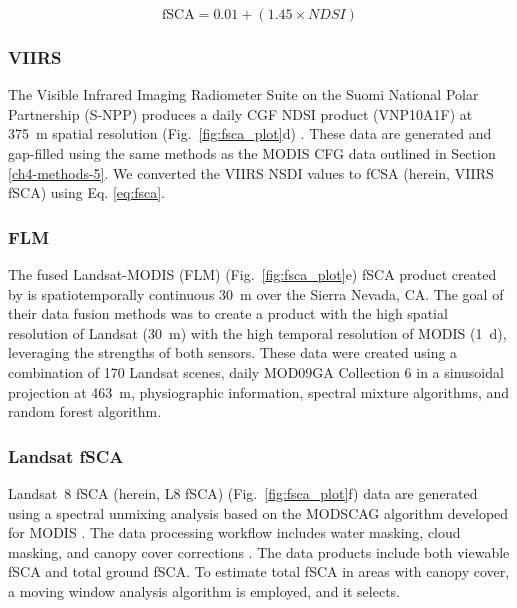 \begin{equation}
\text{fSCA} = 0.01 + (1.45 \times NDSI)
\label{eq:fsca}
\end{equation}

\hypertarget{ch4-methods-6}{\subsubsection{VIIRS}\label{ch4-methods-6}}

The Visible Infrared Imaging Radiometer Suite on the Suomi National Polar Partnership (S-NPP) produces a daily CGF NDSI product (VNP10A1F) at 375~m spatial resolution (Fig.~\ref{fig:fsca_plot}d) \citep{hallEvaluationMODISVIIRS2019}. These data are generated and gap-filled using the same methods as the MODIS CFG data outlined in Section \ref{ch4-methods-5}. We converted the VIIRS NSDI values to fCSA (herein, VIIRS fSCA) using Eq. \ref{eq:fsca}.

\hypertarget{ch4-methods-7}{\subsubsection{FLM}\label{ch4-methods-7}}

The fused Landsat-MODIS (FLM) (Fig.~\ref{fig:fsca_plot}e) fSCA product created by \cite{rittgerMultisensorFusionUsing2021} is spatiotemporally continuous 30~m over the Sierra Nevada, CA. The goal of their data fusion methods was to create a product with the high spatial resolution of Landsat (30~m) with the high temporal resolution of MODIS (1~d), leveraging the strengths of both sensors. These data were created using a combination of 170 Landsat scenes, daily MOD09GA Collection 6 in a sinusoidal projection at 463~m, physiographic information, spectral mixture algorithms, and random forest algorithm. 

\hypertarget{ch4-methods-8}{\subsubsection{Landsat fSCA}\label{ch4-methods-8}}

Landsat~8 fSCA (herein, L8 fSCA) (Fig.~\ref{fig:fsca_plot}f) \citep{selkowitzUSGSLandsatSnow2017} data are generated using a spectral unmixing analysis based on the MODSCAG algorithm developed for MODIS \citep{painterRetrievalSubpixelSnow2009}. The data processing workflow includes water masking, cloud masking, and canopy cover corrections \citep{selkowitzUSGSLandsatSnow2017, stillingerLandsatMODISVIIRS2023}. The data products include both viewable fSCA and total ground fSCA. To estimate total fSCA in areas with canopy cover, a moving window analysis algorithm is employed, and it selects.

